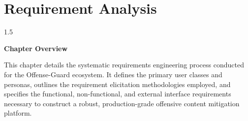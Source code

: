 \documentclass[A4paper,12pt]{report}
\theoremstyle{plain}
\theoremstyle{definition}
\theoremstyle{remark}
\numberwithin{equation}{section}
\begin{document}
\chapter{Requirement Analysis}
\thispagestyle{empty}
\newpage
\begin{spacing}{1.5}

\thispagestyle{empty}

{\centering \Large \bfseries Chapter Overview \par}
\vspace{1cm}

This chapter details the systematic requirements engineering process conducted for the Offense-Guard ecosystem. It defines the primary user classes and personas, outlines the requirement elicitation methodologies employed, and specifies the functional, non-functional, and external interface requirements necessary to construct a robust, production-grade offensive content mitigation platform.

\end{spacing}
\end{document}
